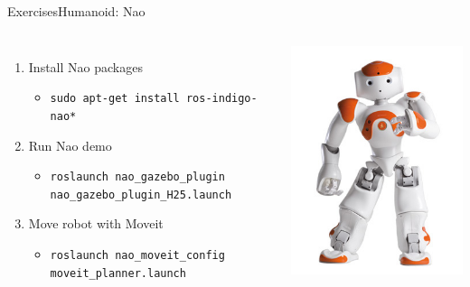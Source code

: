 \documentclass[10pt,compress]{beamer} %
\begin{document}
\begin{frame}{Exercises}{Humanoid: Nao}
	\begin{columns}
	\begin{enumerate}
		\item Install Nao packages
		\begin{itemize}
		\item \texttt{sudo apt-get install ros-indigo-nao*}
		\end{itemize}
	\item Run Nao demo
		\begin{itemize}
		\item \texttt{roslaunch nao\_gazebo\_plugin nao\_gazebo\_plugin\_H25.launch}
		\end{itemize}
	\item Move robot with Moveit
		\begin{itemize}
		\item \texttt{roslaunch nao\_moveit\_config moveit\_planner.launch}
		\end{itemize}
	\end{enumerate}
		\centering\includegraphics[width=\linewidth]{figs/nao.jpeg}
	\end{columns}
\end{frame}
\end{document}
